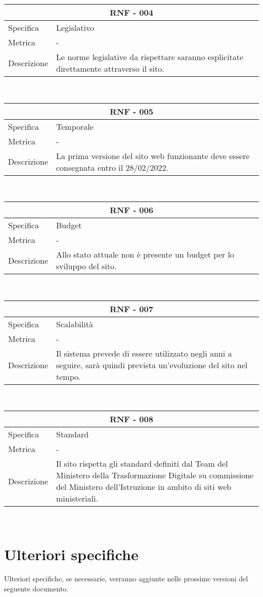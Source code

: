 \documentclass{article}
\begin{document}
\vspace{4mm} 
\begin{tabular}{ |p{3cm}|p{8cm}|  }
	\hline
	\multicolumn{2}{|c|}{\textbf{RNF - 004}} \\
	\hline
	Specifica&Legislativo\\
	\hline
	Metrica &  -\\
	\hline
	Descrizione&Le norme legislative da rispettare saranno esplicitate direttamente attraverso il sito.\\
	\hline
\end{tabular}\\
\vspace{4mm} 
\begin{tabular}{ |p{3cm}|p{8cm}|  }
	\hline
	\multicolumn{2}{|c|}{\textbf{RNF - 005}} \\
	\hline
	Specifica&Temporale \\
	\hline
	Metrica &  -\\
	\hline
	Descrizione&La prima versione del sito web funzionante deve essere consegnata entro il 28/02/2022.\\
	\hline
\end{tabular}\\
\vspace{4mm} 
\begin{tabular}{ |p{3cm}|p{8cm}|  }
	\hline
	\multicolumn{2}{|c|}{\textbf{RNF - 006}} \\
	\hline
	Specifica&Budget \\
	\hline
	Metrica &  -\\
	\hline
	Descrizione&Allo stato attuale non è presente un budget per lo sviluppo del sito.\\
	\hline
\end{tabular}\\
\vspace{4mm} 
\begin{tabular}{ |p{3cm}|p{8cm}|  }
	\hline
	\multicolumn{2}{|c|}{\textbf{RNF - 007}} \\
	\hline
	Specifica&Scalabilità \\
	\hline
	Metrica &  -\\
	\hline
	Descrizione&Il sistema prevede di essere utilizzato negli anni a seguire, sarà quindi prevista un'evoluzione del sito nel tempo.\\
	\hline
\end{tabular}\\
\vspace{4mm} 
\begin{tabular}{ |p{3cm}|p{8cm}|  }
	\hline
	\multicolumn{2}{|c|}{\textbf{RNF - 008}} \\
	\hline
	Specifica&Standard \\
	\hline
	Metrica &  -\\
	\hline
	Descrizione&Il sito rispetta gli standard definiti dal Team del Ministero della Trasformazione Digitale su commissione del Ministero dell'Istruzione in ambito di siti web ministeriali.\\
	\hline
\end{tabular}\\

\section{\textbf{Ulteriori specifiche}}
Ulteriori specifiche, se necessarie, verranno aggiunte nelle prossime versioni del seguente documento.
\end{document}
